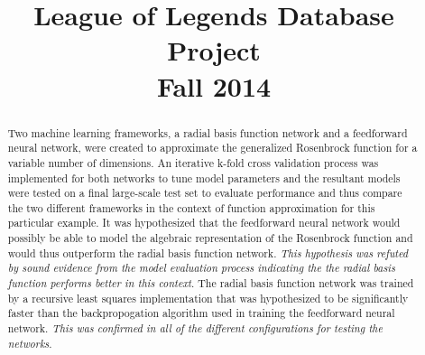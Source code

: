 \documentclass[conference]{IEEEtran}
\begin{document}
\title{League of Legends Database Project \\ Fall 2014}

\author{
  \and
  \and
  }

\maketitle

\begin{abstract}
  Two machine learning frameworks, a radial basis function network and a feedforward neural network, were created to approximate the generalized Rosenbrock function for a variable number of dimensions. An iterative k-fold cross validation process was implemented for both networks to tune model parameters and the resultant models were tested on a final large-scale test set to evaluate performance and thus compare the two different frameworks in the context of function approximation for this particular example. It was hypothesized that the feedforward neural network would possibly be able to model the algebraic representation of the Rosenbrock function and would thus outperform the radial basis function network. \textit{This hypothesis was refuted by sound evidence from the model evaluation process indicating the the radial basis function performs better in this context}. The radial basis function network was trained by a recursive least squares implementation that was hypothesized to be significantly faster than the backpropogation algorithm used in training the feedforward neural network. \textit{This was confirmed in all of the different configurations for testing the networks}. 
  
\end{abstract}
\end{document}

